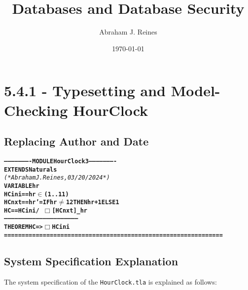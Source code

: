 \documentclass{article}
\title{Databases and Database Security}
\author{Abraham J. Reines}
\date{\today}
\begin{document}
\maketitle

\section*{5.4.1 - Typesetting and Model-Checking HourClock}

\subsection*{Replacing Author and Date}
\begin{mdframed}[innertopmargin=10pt, innerbottommargin=10pt, innerleftmargin=10pt, innerrightmargin=10pt, backgroundcolor=gray!10, roundcorner=10pt, shadow=true, shadowsize=6, shadowcolor=black!50, frametitle={Module Replacement:}, frametitlebackgroundcolor=gray!20]
\begin{alltt}
\textbf{---------------------- MODULE HourClock3 ----------------------}
\textbf{EXTENDS Naturals}
\textit{(* Abraham J. Reines, 03/20/2024 *)}
\textbf{VARIABLE hr}
\textbf{HCini  ==  hr \(\in\) (1 .. 11)}
\textbf{HCnxt  ==  hr' = IF hr \(\neq\) 12 THEN hr + 1 ELSE 1}
\textbf{HC  ==  HCini /\ \(\Box\)[HCnxt]\_hr}
\textbf{--------------------------------------------------------------}
\textbf{THEOREM  HC => \(\Box\)HCini}
\textbf{==============================================================}
\end{alltt}
\end{mdframed}


\subsection*{System Specification Explanation}
The system specification of the \texttt{HourClock.tla} is explained as follows:
\end{document}
